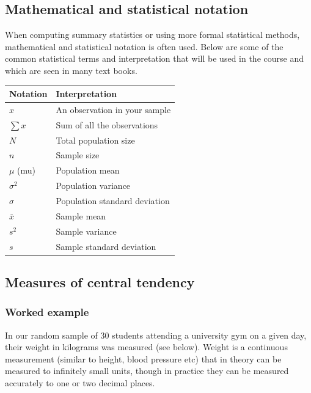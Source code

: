 \documentclass[
]{memoir}
\begin{document}
\hypertarget{mathematical-and-statistical-notation}{%
\subsection{Mathematical and statistical notation}\label{mathematical-and-statistical-notation}}

When computing summary statistics or using more formal statistical methods, mathematical and statistical notation is often used. Below are some of the common statistical terms and interpretation that will be used in the course and which are seen in many text books.

\begin{longtable}[]{@{}ll@{}}
\toprule
Notation & Interpretation \\
\midrule
\endhead
\(x\) & An observation in your sample \\
\(\sum x\) & Sum of all the observations \\
\(N\) & Total population size \\
\(n\) & Sample size \\
\(\mu\) (mu) & Population mean \\
\(\sigma^2\) & Population variance \\
\(\sigma\) & Population standard deviation \\
\(\bar{x}\) & Sample mean \\
\(s^2\) & Sample variance \\
\(s\) & Sample standard deviation \\
\bottomrule
\end{longtable}

\hypertarget{measures-of-central-tendency}{%
\subsection{Measures of central tendency}\label{measures-of-central-tendency}}

\hypertarget{worked-example-1}{%
\subsubsection{Worked example}\label{worked-example-1}}

In our random sample of 30 students attending a university gym on a given day, their weight in kilograms was measured (see below). Weight is a continuous measurement (similar to height, blood pressure etc) that in theory can be measured to infinitely small units, though in practice they can be measured accurately to one or two decimal places.
\end{document}
